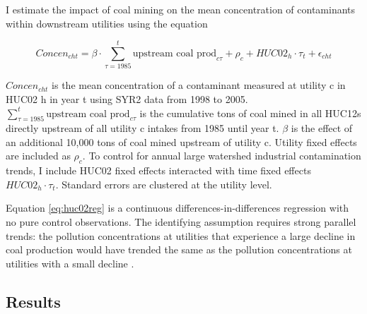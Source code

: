 \documentclass[12pt]{article}
\begin{document}
I estimate the impact of coal mining on the mean concentration of contaminants within downstream utilities using the equation

\begin{equation}\label{eq:huc02reg}
    \textit{Concen}_{cht}= \beta\cdot\sum_{\tau=1985}^t\text{upstream coal prod}_{c\tau}  + \rho_c + HUC02_h\cdot\tau_t + \epsilon_{cht}
\end{equation}

$\textit{Concen}_{cht}$ is the mean concentration of a contaminant measured at utility c in HUC02 h in year t using SYR2 data from 1998 to 2005. $\sum_{\tau=1985}^t\text{upstream coal prod}_{c\tau}$ is the cumulative tons of coal mined in all HUC12s directly upstream of all utility c intakes from 1985 until year t. $\beta$ is the effect of an additional 10,000 tons of coal mined upstream of utility c. Utility fixed effects are included as $\rho_c$. To control for annual large watershed industrial contamination trends, I include HUC02 fixed effects interacted with time fixed effects $HUC02_h\cdot\tau_t$. Standard errors are clustered at the utility level.

Equation \ref{eq:huc02reg} is a continuous differences-in-differences regression with no pure control observations. The identifying assumption requires strong parallel trends: the pollution concentrations at utilities that experience a large decline in coal production would have trended the same as the pollution concentrations at utilities with a small decline \parencite{callaway2024difference}.



%

%

\subsection{Results}
\end{document}
